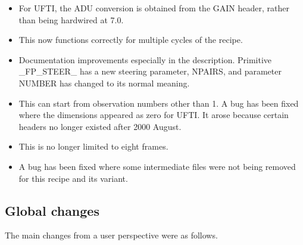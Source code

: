 \documentclass[twoside,11pt,nolof]{starlink}
\begin{document}
\begin{itemize}
    \item {}
       For UFTI, the ADU conversion is obtained from the GAIN header,
       rather than being hardwired at 7.0.
    \item {}
       This now functions correctly for multiple cycles of the recipe.
    \item {}
       Documentation improvements especially in the description.
       Primitive \_FP\_STEER\_ has a new steering parameter, NPAIRS,
       and parameter NUMBER has changed to its normal meaning.
    \item {}
       This can start from observation numbers other than 1.  A bug
       has been fixed where the dimensions appeared as zero for UFTI.
       It arose because certain headers no longer existed after 2000
       August.
    \item {}
       This is no longer limited to eight frames.
    \item {}
       A bug has been fixed where some intermediate files were not being
       removed for this recipe and its variant.
\end{itemize}

\subsection{Global changes}

The main changes from a user perspective were as follows.
\end{document}
